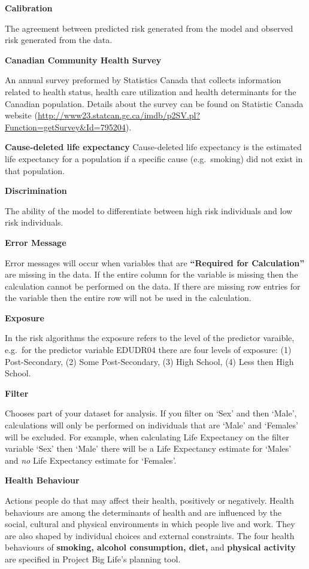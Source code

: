 \documentclass[]{book}
\begin{document}
\textbf{Calibration}

The agreement between predicted risk generated from the model and
observed risk generated from the data.

\textbf{Canadian Community Health Survey}

An annual survey preformed by Statistics Canada that collects
information related to health status, health care utilization and health
determinants for the Canadian population. Details about the survey can
be found on Statistic Canada website
(\url{http://www23.statcan.gc.ca/imdb/p2SV.pl?Function=getSurvey\&Id=795204}).

\textbf{Cause-deleted life expectancy} Cause-deleted life expectancy is the estimated life
expectancy for a population if a specific cause (e.g.~smoking) did not
exist in that population.

\textbf{Discrimination}

The ability of the model to differentiate between high risk individuals
and low risk individuals.

\textbf{Error Message}

Error messages will occur when variables that are \textbf{``Required for
Calculation''} are missing in the data. If the entire column for the
variable is missing then the calculation cannot be performed on the
data. If there are missing row entries for the variable then the entire
row will not be used in the calculation.

\textbf{Exposure}

In the risk algorithms the exposure refers to the level of the predictor
varaible, e.g.~for the predictor variable EDUDR04 there are four levels
of exposure: (1) Post-Secondary, (2) Some Post-Secondary, (3) High
School, (4) Less then High School.

\textbf{Filter}

Chooses part of your dataset for analysis. If you filter on
`Sex' and then `Male', calculations will only be performed on
individuals that are `Male' and `Females' will be excluded. For example,
when calculating Life Expectancy on the filter variable `Sex' then
`Male' there will be a Life Expectancy estimate for `Males' and
\emph{no} Life Expectancy estimate for `Females'.

\textbf{Health Behaviour}

Actions people do that may affect their health, positively or
negatively. Health behaviours are among the determinants of health and
are influenced by the social, cultural and physical environments in
which people live and work.\citep{StatsCan2010} They are also shaped by
individual choices and external constraints.\citep{StatsCan2010} The
four health behaviours of \textbf{smoking, alcohol consumption, diet,}
and \textbf{physical activity} are specified in Project Big Life's
planning tool.
\end{document}
